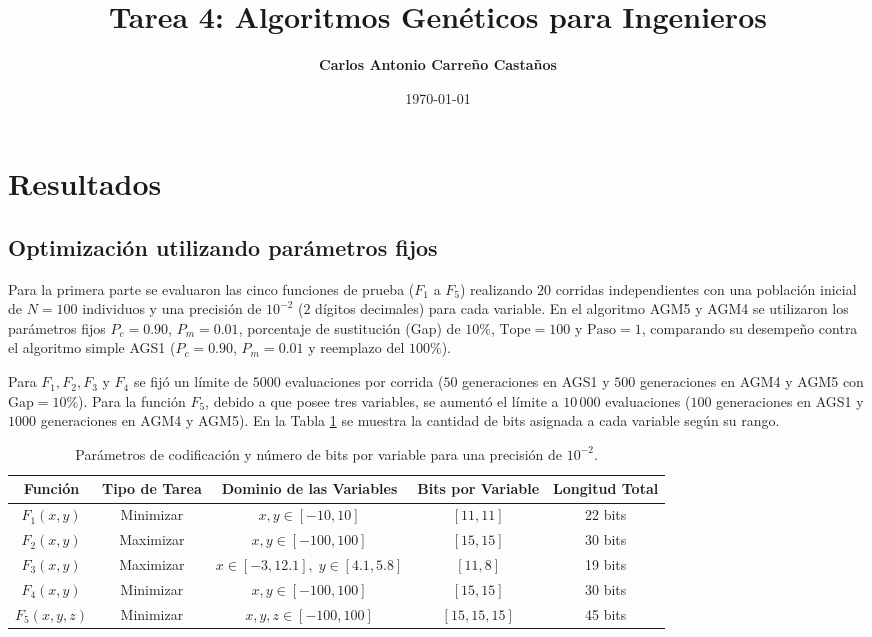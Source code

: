 \documentclass[11pt,letterpaper]{article}
\title{\textbf{Tarea 4: Algoritmos Genéticos para Ingenieros}}
\author{\textbf{Carlos Antonio Carreño Castaños}}
\date{\today}
\begin{document}
\maketitle


\section{Resultados}

\subsection{Optimización utilizando parámetros fijos}

Para la primera parte se evaluaron las cinco funciones de prueba ($F_1$ a $F_5$) realizando $20$ corridas independientes con una población inicial de $N = 100$ individuos y una precisión de $10^{-2}$ ($2$ dígitos decimales) para cada variable. En el algoritmo AGM5 y AGM4 se utilizaron los parámetros fijos $P_c = 0.90$, $P_m = 0.01$, porcentaje de sustitución (Gap) de $10\%$, $\text{Tope} = 100$ y $\text{Paso} = 1$, comparando su desempeño contra el algoritmo simple AGS1 ($P_c = 0.90$, $P_m = 0.01$ y reemplazo del $100\%$).

Para $F_1, F_2, F_3$ y $F_4$ se fijó un límite de $5000$ evaluaciones por corrida ($50$ generaciones en AGS1 y $500$ generaciones en AGM4 y AGM5 con $\text{Gap} = 10\%$). Para la función $F_5$, debido a que posee tres variables, se aumentó el límite a $10\,000$ evaluaciones ($100$ generaciones en AGS1 y $1000$ generaciones en AGM4 y AGM5). En la Tabla \ref{tab:bits_funciones} se muestra la cantidad de bits asignada a cada variable según su rango.

\begin{table}[H]
\centering
\caption{Parámetros de codificación y número de bits por variable para una precisión de $10^{-2}$.}
\label{tab:bits_funciones}
\begin{tabular}{@{}ccccc@{}}
\toprule
\textbf{Función} & \textbf{Tipo de Tarea} & \textbf{Dominio de las Variables} & \textbf{Bits por Variable} & \textbf{Longitud Total} \\ \midrule
$F_1(x,y)$   & Minimizar & $x, y \in [-10, 10]$          & $[11, 11]$     & 22 bits \\
$F_2(x,y)$   & Maximizar & $x, y \in [-100, 100]$        & $[15, 15]$     & 30 bits \\
$F_3(x,y)$   & Maximizar & $x \in [-3, 12.1], \; y \in [4.1, 5.8]$ & $[11, 8]$ & 19 bits \\
$F_4(x,y)$   & Minimizar & $x, y \in [-100, 100]$        & $[15, 15]$     & 30 bits \\
$F_5(x,y,z)$ & Minimizar & $x, y, z \in [-100, 100]$     & $[15, 15, 15]$ & 45 bits \\ \bottomrule
\end{tabular}
\end{table}
\end{document}
